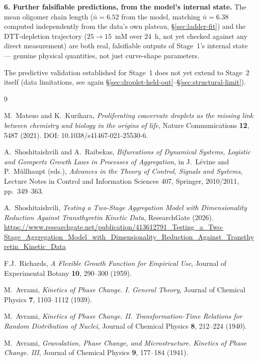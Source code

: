 \documentclass[11pt]{article}
\begin{document}
\textbf{6. Further falsifiable predictions, from the model's internal state.} The mean
oligomer chain length ($\bar n=6.52$ from the model, matching $\bar n=6.38$ computed
independently from the data's own plateau, \S\ref{sec:ladder-fit}) and the DTT-depletion
trajectory ($25\to15$~mM over $24$~h, not yet checked against any direct measurement) are both
real, falsifiable outputs of Stage~1's internal state --- genuine physical quantities, not just
curve-shape parameters.

The predictive validation established for Stage~1 does not yet extend to Stage~2 itself (data
limitations, see again \S\ref{sec:droplet-held-out}--\S\ref{sec:structural-limit}).

\begin{thebibliography}{9}
\small

 M.~Matsuo and K.~Kurihara, \emph{Proliferating coacervate droplets as the
missing link between chemistry and biology in the origins of life}, Nature Communications
\textbf{12}, 5487 (2021). DOI: 10.1038/s41467-021-25530-6.

 A.~Shoshitaishvili and A.~Raibekas, \emph{Bifurcations of Dynamical Systems,
Logistic and Gompertz Growth Laws in Processes of Aggregation}, in J.~L\'evine and
P.~M\"ullhaupt (eds.), \emph{Advances in the Theory of Control, Signals and Systems}, Lecture
Notes in Control and Information Sciences 407, Springer, 2010/2011, pp.~349--363.

 A.~Shoshitaishvili, \emph{Testing a Two-Stage Aggregation Model with
Dimensionality Reduction Against Transthyretin Kinetic Data}, ResearchGate (2026).
\url{https://www.researchgate.net/publication/413612791_Testing_a_Two-Stage_Aggregation_Model_with_Dimensionality_Reduction_Against_Transthyretin_Kinetic_Data}

 F.J.~Richards, \emph{A Flexible Growth Function for Empirical Use},
Journal of Experimental Botany \textbf{10}, 290--300 (1959).

 M.~Avrami, \emph{Kinetics of Phase Change. I. General Theory}, Journal of
Chemical Physics \textbf{7}, 1103--1112 (1939).

 M.~Avrami, \emph{Kinetics of Phase Change. II. Transformation-Time
Relations for Random Distribution of Nuclei}, Journal of Chemical Physics \textbf{8}, 212--224
(1940).

 M.~Avrami, \emph{Granulation, Phase Change, and Microstructure. Kinetics of
Phase Change. III}, Journal of Chemical Physics \textbf{9}, 177--184 (1941).

\end{thebibliography}
\end{document}
